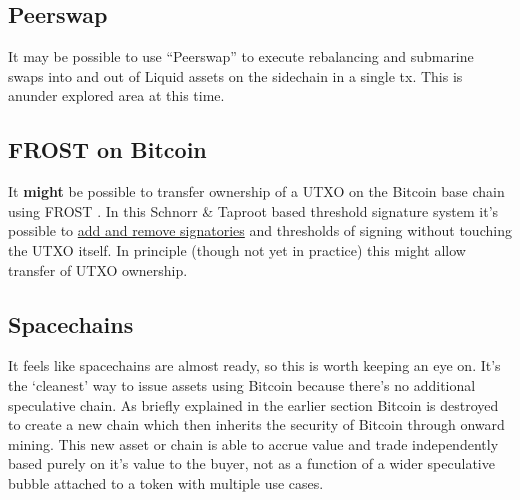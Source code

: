 \subsection{Peerswap}
It may be possible to use ``Peerswap'' to execute rebalancing and submarine swaps into and out of Liquid assets on the sidechain in a single tx. This is anunder explored area at this time.
\subsection{FROST on Bitcoin}
It \textbf{might} be possible to transfer ownership of a UTXO on the Bitcoin base chain using FROST \cite{komlo2020frost}. In this Schnorr \& Taproot based threshold signature system it's possible to \href{https://btctranscripts.com/sydney-bitcoin-meetup/2022-03-29-socratic-seminar/}{add and remove signatories} and thresholds of signing without touching the UTXO itself. In principle (though not yet in practice) this might allow transfer of UTXO ownership. 
\subsection{Spacechains}
It feels like spacechains are almost ready, so this is worth keeping an eye on. It's the `cleanest' way to issue assets using Bitcoin because there's no additional speculative chain. As briefly explained in the earlier section Bitcoin is destroyed to create a new chain which then inherits the security of Bitcoin through onward mining. This new asset or chain is able to accrue value and trade independently based purely on it's value to the buyer, not as a function of a wider speculative bubble attached to a token with multiple use cases.
